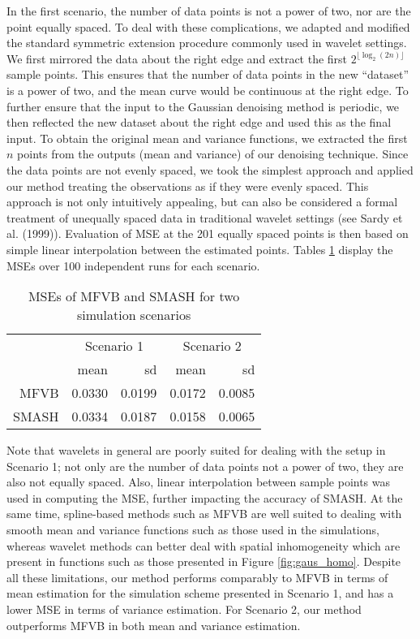 \documentclass[12pt]{article}
\begin{document}
In the first scenario, the number of data points is not a power of two, nor are the point equally spaced. To deal with these complications, we adapted and modified the standard symmetric extension procedure commonly used in wavelet settings. We first mirrored the data about the right edge and extract the first $2^{\lfloor\log_2(2n)\rfloor}$ sample points. This ensures that the number of data points in the new ``dataset'' is a power of two, and the mean curve would be continuous at the right edge. To further ensure that the input to the Gaussian denoising method is periodic, we then reflected the new dataset about the right edge and used this as the final input. To obtain the original mean and variance functions, we extracted the first $n$ points from the outputs (mean and variance) of our denoising technique. Since the data points are not evenly spaced, we took the simplest approach and applied our method treating the observations as if they were evenly spaced. This approach is not only intuitively appealing, but can also be considered a formal treatment of unequally spaced data in traditional wavelet settings (see Sardy et al. (1999)). Evaluation of MSE at the 201 equally spaced points is then based on simple linear interpolation between the estimated points. Tables \ref{table:mfvb_comp} display the MSEs over 100 independent runs for each scenario.
\begin{table}[ht]
\centering
\begin{tabular}{rrrrr}
\hline
& \multicolumn{2}{c}{Scenario 1}&\multicolumn{2}{c}{Scenario 2}\\
\cline{2-5}
& mean & sd & mean & sd \\
\hline
MFVB & 0.0330 & 0.0199 & 0.0172 & 0.0085 \\
SMASH & 0.0334 & 0.0187 & 0.0158 & 0.0065 \\
\hline
\end{tabular}
\caption{MSEs of MFVB and SMASH for two simulation scenarios}
\label{table:mfvb_comp}
\end{table}

Note that wavelets in general are poorly suited for dealing with the setup in Scenario 1; not only are the number of data points not a power of two, they are also not equally spaced. Also, linear interpolation between sample points was used in computing the MSE, further impacting the accuracy of SMASH. At the same time, spline-based methods such as MFVB are well suited to dealing with smooth mean and variance functions such as those used in the simulations, whereas wavelet methods can better deal with spatial inhomogeneity which are present in functions such as those presented in Figure \ref{fig:gaus_homo}. Despite all these limitations, our method performs comparably to MFVB in terms of mean estimation for the simulation scheme presented in Scenario 1, and has a lower MSE in terms of variance estimation. For Scenario 2, our method outperforms MFVB in both mean and variance estimation. 
\end{document}
